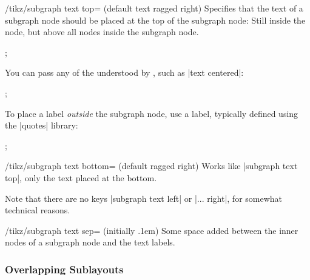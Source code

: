 \begin{key}{/tikz/subgraph text top= (default text ragged right)}
    Specifies that the text of a subgraph node should be placed at the top of
    the subgraph node: Still inside the node, but above all nodes inside the
    subgraph node.
\begin{codeexample}[]
\tikz [subgraph text top=text ragged left]
  ;
\end{codeexample}
    You can pass any of the  understood by
    \tikzname, such as |text centered|:
\begin{codeexample}[width=5cm]
\tikz [subgraph text top=text centered]
  ;
\end{codeexample}
    To place a label \emph{outside} the subgraph node, use a label, typically
    defined using the |quotes| library:
\begin{codeexample}[]
\tikz {};
\end{codeexample}
\end{key}

\begin{key}{/tikz/subgraph text bottom= (default ragged right)}
    Works like |subgraph text top|, only the text placed at the bottom.
\end{key}

Note that there are no keys |subgraph text left| or |... right|, for somewhat
technical reasons.

\begin{key}{/tikz/subgraph text sep= (initially .1em)}
    Some space added between the inner nodes of a subgraph node and the text
    labels.
\end{key}


\subsubsection{Overlapping Sublayouts}
\label{section-gd-layout-resolve}

